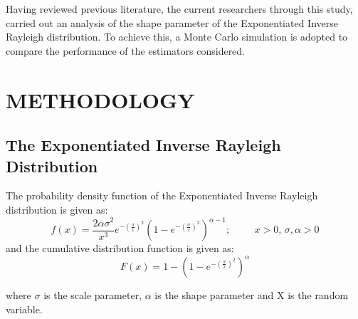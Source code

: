 \documentclass[a4paper,12pt]{report}
\newcommand{\para}{\hspace{0.5cm}}
\begin{document}
\noindent\para Having reviewed previous literature, the current researchers through this study, carried out an analysis of the shape parameter of the Exponentiated Inverse Rayleigh distribution. To achieve this, a Monte Carlo simulation is adopted to compare the performance of the estimators considered.

\newpage
\chapter{METHODOLOGY}
\section{The Exponentiated Inverse Rayleigh Distribution}
The probability density function of the Exponentiated Inverse Rayleigh distribution is given as:
\begin{equation}\label{3.1}
f(x)=\frac{2\alpha\sigma^2}{x^3}e^{-(\frac{\sigma}{x})^2}\left(1-e^{-(\frac{\sigma}{x})^2}\right)^{\alpha-1};\hspace{1cm}x>0,\,\sigma,\alpha>0
\end{equation}
and the cumulative distribution function is given as:
\begin{equation}\label{3.2}
F(x)=1-\left(1-e^{-(\frac{\sigma}{x})^2}\right)^\alpha
\end{equation}

\noindent where $\sigma$ is the scale parameter, $\alpha$ is the shape parameter and X is the random variable.\\
\end{document}
